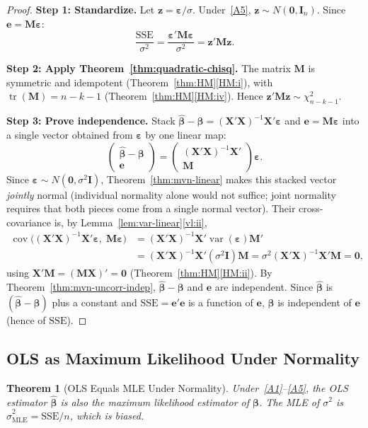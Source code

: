 \documentclass[14pt]{extarticle}
\theoremstyle{plain}
\newtheorem{theorem}{Theorem}[section]
\theoremstyle{definition}
\theoremstyle{remark}
\DeclareMathOperator\var{var}
\DeclareMathOperator\cov{cov}
\DeclareMathOperator\tr{tr}
\newcommand{\SSE}{\mathrm{SSE}}
\newcommand{\bX}{\mathbf{X}}
\def\bb{\boldsymbol{\beta}}
\newcommand{\be}{\boldsymbol{\varepsilon}}
\newcommand{\bI}{\mathbf{I}}
\newcommand{\bM}{\mathbf{M}}
\newcommand{\bzero}{\mathbf{0}}
\newcommand{\bz}{\mathbf{z}}
\begin{document}
\begin{proof}
\textbf{Step 1: Standardize.} Let $\bz = \be/\sigma$. Under~\ref{A5}, $\bz \sim N(\bzero, \bI_n)$. Since $\mathbf{e} = \bM\be$:
\[
\frac{\SSE}{\sigma^2} = \frac{\be'\bM\be}{\sigma^2} = \bz'\bM\bz.
\]

\textbf{Step 2: Apply Theorem~\ref{thm:quadratic-chisq}.} The matrix $\bM$ is symmetric and idempotent (Theorem~\ref{thm:HM}\ref{HM:i}), with $\tr(\bM) = n - k - 1$ (Theorem~\ref{thm:HM}\ref{HM:iv}). Hence $\bz'\bM\bz \sim \chi^2_{n-k-1}$.

\textbf{Step 3: Prove independence.} Stack $\hat{\bb} - \bb = (\bX'\bX)^{-1}\bX'\be$ and $\mathbf{e} = \bM\be$ into a single vector obtained from $\be$ by one linear map:
\[
\begin{pmatrix}\hat{\bb} - \bb \\ \mathbf{e}\end{pmatrix} = \begin{pmatrix}(\bX'\bX)^{-1}\bX' \\ \bM\end{pmatrix}\be.
\]
Since $\be \sim N(\bzero, \sigma^2\bI)$, Theorem~\ref{thm:mvn-linear} makes this stacked vector \emph{jointly} normal (individual normality alone would not suffice; joint normality requires that both pieces come from a single normal vector). Their cross-covariance is, by Lemma~\ref{lem:var-linear}\ref{vl:ii},
\begin{align*}
\cov\!\bigl((\bX'\bX)^{-1}\bX'\be,\; \bM\be\bigr) &= (\bX'\bX)^{-1}\bX'\var(\be)\bM'\\
&= (\bX'\bX)^{-1}\bX'(\sigma^2\bI)\bM = \sigma^2(\bX'\bX)^{-1}\bX'\bM = \bzero,
\end{align*}
using $\bX'\bM = (\bM\bX)' = \bzero$ (Theorem~\ref{thm:HM}\ref{HM:ii}). By Theorem~\ref{thm:mvn-uncorr-indep}, $\hat{\bb} - \bb$ and $\mathbf{e}$ are independent. Since $\hat{\bb}$ is $(\hat{\bb} - \bb)$ plus a constant and $\SSE = \mathbf{e}'\mathbf{e}$ is a function of $\mathbf{e}$, $\hat{\bb}$ is independent of $\mathbf{e}$ (hence of $\SSE$).
\end{proof}

\subsection{OLS as Maximum Likelihood Under Normality}

\begin{theorem}[OLS Equals MLE Under Normality]\label{thm:mle}
Under~\ref{A1}--\ref{A5}, the OLS estimator $\hat{\bb}$ is also the maximum likelihood estimator of $\bb$. The MLE of $\sigma^2$ is $\hat{\sigma}^2_{\mathrm{MLE}} = \SSE/n$, which is biased.
\end{theorem}
\end{document}
